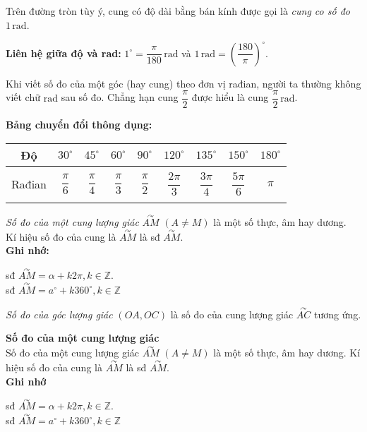\begin{dn}
Trên đường tròn tùy ý, cung có độ dài bằng bán kính được gọi là \textit{cung co số đo $1\, \mathrm{rad}$}.
\end{dn}
\textbf{Liên hệ giữa độ và rad:} $1^\circ=\dfrac{\pi}{180}\, \mathrm{rad}$ và $1\, \mathrm{rad}=\left(\dfrac{180}{\pi}\right)^\circ$.

\begin{note}
Khi viết số đo của một góc (hay cung) theo đơn vị rađian, người ta thường không viết chữ $\mathrm{rad}$ sau số đo. Chẳng hạn cung $\dfrac{\pi}{2}$ được hiểu là cung $\dfrac{\pi}{2}\, \mathrm{rad}$.
\end{note}

\noindent\textbf{Bảng chuyển đổi thông dụng:}
\begin{center}
\begin{tabular}{|c|c|c|c|c|c|c|c|c|}
\hline
Độ & $30^\circ$ & $45^\circ$ & $60^\circ$ & $90^\circ$ & $120^\circ$ & $135^\circ$ & $150^\circ$ & $180^\circ$\\ \hline
&&&&&&&&\\[-0.2cm]
Rađian & $\dfrac{\pi}{6}$ & $\dfrac{\pi}{4}$ & $\dfrac{\pi}{3}$ & $\dfrac{\pi}{2}$ & $\dfrac{2\pi}{3}$ & $\dfrac{3\pi}{4}$ & $\dfrac{5\pi}{6}$ & $\pi$ \\&&&&&&&&\\ [-0.01cm] \hline
\end{tabular}
\end{center}

\begin{dn}
\textit{Số đo của một cung lượng giác} $\overset{\curvearrowright}{AM}$ $(A\neq M)$ là một số thực, âm hay dương.\\
Kí hiệu số đo của cung là $\overset{\curvearrowright}{AM}$ là sđ $\overset{\curvearrowright}{AM}$.\\
\textbf{Ghi nhớ:}
\begin{center}
sđ $\overset{\curvearrowright}{AM}=\alpha +k2\pi, k\in \mathbb{Z}$.\\
sđ $\overset{\curvearrowright}{AM}=a^{\circ}+k360^{\circ}, k\in \mathbb{Z}$
\end{center}
\end{dn}

\begin{dn}
\textit{Số đo của góc lượng giác} $(OA, OC)$ là số đo của cung lượng giác $\overset{\curvearrowright}{AC}$ tương ứng.
\end{dn}

\noindent\textbf{Số đo của một cung lượng giác}\\
Số đo của một cung lượng giác $\overset{\curvearrowright}{AM}$ $(A\neq M)$ là một số thực, âm hay dương. Kí hiệu số đo của cung là $\overset{\curvearrowright}{AM}$ là sđ $\overset{\curvearrowright}{AM}$.\\
\textbf{Ghi nhớ}
\begin{center}
sđ $\overset{\curvearrowright}{AM}=\alpha +k2\pi, k\in \mathbb{Z}$.\\
sđ $\overset{\curvearrowright}{AM}=a^{\circ}+k360^{\circ}, k\in \mathbb{Z}$
\end{center}

